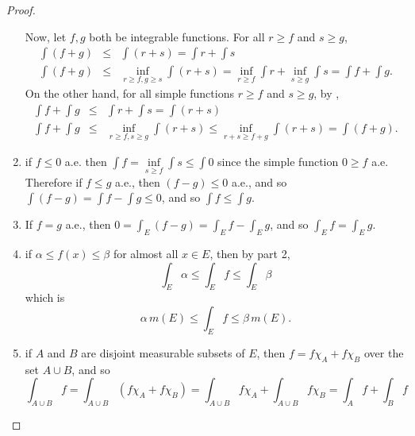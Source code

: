 \begin{pblm}
\begin{proof}
\begin{enumerate}
		Now, let $f, g$ both be integrable functions. For all $r \ge f$ and $s \ge g$, 
		\begin{equation*}
		\begin{array}{rcl}
			\int (f + g) &\le& \int (r + s) = \int r + \int s\\
			\int (f + g) &\le&\inf\limits_{r\ge f, g \ge s} \int (r + s) = 
				\inf\limits_{r\ge f}\int r + \inf\limits_{s\ge g}\int s = \int f + \int g. 
		\end{array}
		\end{equation*}
		On the other hand, for all simple functions $r \ge f$ and $s \ge g$,  by , 
		\begin{equation*}
		\begin{array}{rcl}
			\int f + \int g & \le & \int r + \int s = \int (r + s)\\
			\int f + \int g & \le & \inf\limits_{r\ge f, s\ge g}\int (r + s) 
			\le \inf\limits_{r+s\ge f+g}\int (r + s)= \int (f + g). 
		\end{array}
		\end{equation*}

	\item if $f \le 0$ a.e. then $\int f = \inf\limits_{s\ge f}\int s \le \int 0$ since the simple function 
		$0 \ge f$ a.e. Therefore if $f \le g$ a.e., then $(f - g) \le 0$ a.e., and so 
		$\int( f - g) = \int f - \int g  \le 0$, and so $\int f \le \int g$. 

	\item If $f = g$ a.e., then $0 = \int_E (f - g) = \int_E f - \int_E g$, and so $\int_E f = \int_E g$. 

	\item if $\alpha \le f(x) \le \beta$ for almost all $x \in E$, then by part 2, 
		\begin{equation*}\int_E \alpha \le \int_E f \le \int_E \beta\end{equation*} which is 
		\begin{equation*}\alpha \, m(E) \le \int_E f \le \beta \, m(E). \end{equation*} 

	\item if $A$ and $B$ are disjoint measurable subsets of $E$, then $f = f \chi_A + f\chi_B$ over 
		the set $A \cup B$, and so 
		\begin{equation*}
			\int_{A\cup B} f = 
			\int_{A\cup B} (f\chi_A + f\chi_B) = 
			\int_{A\cup B} f\chi_A + \int_{A \cup B} f\chi_B = 
			\int_A f + \int_B f
		\end{equation*}
\end{enumerate}
\end{proof}
\end{pblm}

